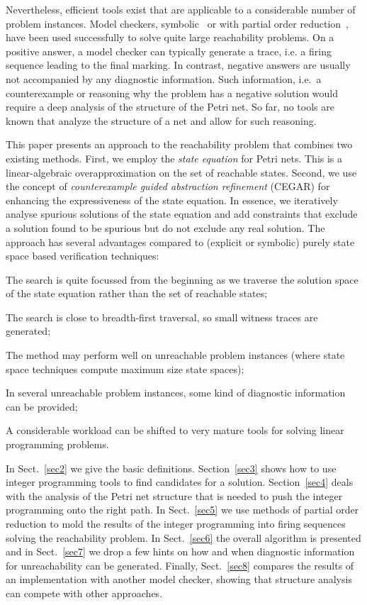 \documentclass{LMCS}
\begin{document}
Nevertheless, efficient tools exist that are applicable to a considerable number of problem instances.
Model checkers, symbolic~\cite{cms06} or with partial order reduction~\cite{Wolf_2007_icatpn}, have been used
successfully to solve quite large reachability problems. On a positive answer, a model checker can typically generate
a trace, i.e. a firing sequence leading to the final marking. In contrast, negative answers are usually
not accompanied by any diagnostic information. Such information, i.e.\ a counterexample or reasoning
why the problem has a negative solution would require a deep analysis of the structure of the
Petri net. So far, no tools are known that analyze the structure of a net and allow for such
reasoning. 

This paper presents an approach to the reachability problem that combines two existing methods. First,
we employ the {\em state equation} for Petri nets. This is a linear-algebraic overapproximation on the
set of reachable states. Second, we use the concept of {\em counterexample guided abstraction refinement}
(CEGAR) \cite{cegar} for enhancing the expressiveness of the state equation. In essence, we iteratively analyse spurious
solutions of the state equation and add constraints that exclude a solution found to be spurious but do not exclude
any real solution. The approach has several advantages compared to (explicit or symbolic) purely state space based
verification techniques:
\begin{iteMize}{}
\item The search is quite focussed from the beginning as we traverse the solution space of the state equation rather than the set of reachable states;
\item The search is close to breadth-first traversal, so small witness traces are generated;
\item The method may perform well on unreachable problem instances (where state space techniques compute maximum size state spaces);
\item In several unreachable problem instances, some kind of diagnostic information can be provided; 
\item A considerable workload can be shifted to very mature tools for solving linear programming problems.
\end{iteMize}

\noindent In Sect.~\ref{sec2} we give the basic
definitions. Section~\ref{sec3} shows how to use integer programming tools to find candidates
for a solution. Section~\ref{sec4} deals with the analysis of the Petri net structure that
is needed to push the integer programming onto the right path. In Sect.~\ref{sec5} we
use methods of partial order reduction to mold the results of the integer programming
into firing sequences solving the reachability problem. 
In Sect.~\ref{sec6} the overall algorithm is presented and in Sect.~\ref{sec7} we drop
a few hints on how and when diagnostic information for unreachability can be generated.
Finally, Sect.~\ref{sec8} compares the results of an implementation
with another model checker, showing that structure analysis can compete with other approaches.
\end{document}
